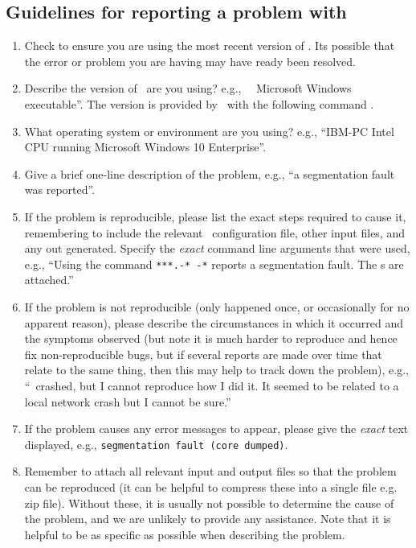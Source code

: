 \subsection{Guidelines for reporting a problem with \IBM\label{sec:error-guidelines}}

\begin{enumerate}

\item Check to ensure you are using the most recent version of \IBM. Its possible that the error or problem you are having may have ready been resolved. 

\item Describe the version of \IBM\ are you using? e.g., \IBM\ \VER\ Microsoft Windows executable''. The version is provided by \IBM\ with the following command .

\item What operating system or environment are you using? e.g., ``IBM-PC Intel CPU running Microsoft Windows 10 Enterprise''.

\item Give a brief one-line description of the problem, e.g., ``a segmentation fault was reported''.

\item If the problem is reproducible, please list the exact steps required to cause it, remembering to include the relevant \IBM\ configuration file, other input files, and any out generated. Specify the \emph{exact} command line arguments that were used, e.g., ``Using the command \texttt{***.-* -*} reports a segmentation fault. The \config s are attached.''

\item If the problem is not reproducible (only happened once, or occasionally for no apparent reason), please describe the circumstances in which it occurred and the symptoms observed (but note it is much harder to reproduce and hence fix non-reproducible bugs, but if several reports are made over time that relate to the same thing, then this may help to track down the problem), e.g., ``\IBM\ crashed, but I cannot reproduce how I did it. It seemed to be related to a local network crash but I cannot be sure.''

\item If the problem causes any error messages to appear, please give the \emph{exact} text displayed, e.g., \texttt{segmentation fault (core dumped)}.

\item Remember to attach all relevant input and output files so that the problem can be reproduced (it can be helpful to compress these into a single file e.g. zip file). Without these, it is usually not possible to determine the cause of the problem, and we are unlikely to provide any assistance. Note that it is helpful to be as specific as possible when describing the problem.

\end{enumerate}
